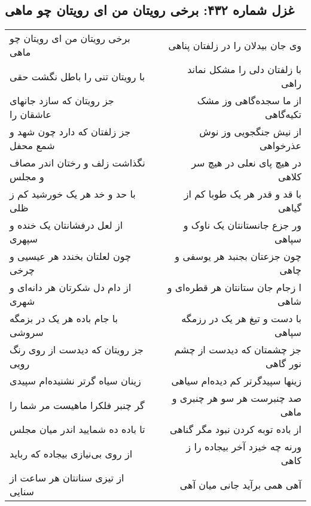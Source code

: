 \begin{center}
\section*{غزل شماره ۴۳۲: برخی رویتان من ای رویتان چو ماهی}
\label{sec:432}
\begin{longtable}{l p{0.5cm} r}
برخی رویتان من ای رویتان چو ماهی
&&
وی جان بیدلان را در زلفتان پناهی
\\
با رویتان تنی را باطل نگشت حقی
&&
با زلفتان دلی را مشکل نماند راهی
\\
جز رویتان که سازد جانهای عاشقان را
&&
از ما سجده‌گاهی وز مشک تکیه‌گاهی
\\
جز زلفتان که دارد چون شهد و شمع محفل
&&
از نیش جنگجویی وز نوش عذرخواهی
\\
نگذاشت زلف و رختان اندر مصاف و مجلس
&&
در هیچ پای نعلی در هیچ سر کلاهی
\\
با حد و خد هر یک خورشید کم ز ظلی
&&
با قد و قدر هر یک طوبا کم از گیاهی
\\
از لعل درفشانتان یک خنده و سپهری
&&
ور جزع جانستانتان یک ناوک و سپاهی
\\
چون لعلتان بخندد هر عیسیی و چرخی
&&
چون جزعتان بجنبد هر یوسفی و چاهی
\\
از دام دل شکرتان هر دانه‌ای و شهری
&&
ا زجام جان ستانتان هر قطره‌ای و شاهی
\\
با جام باده هر یک در بزمگه سروشی
&&
با دست و تیغ هر یک در رزمگه سپاهی
\\
جز رویتان که دیدست از روی رنگ رویی
&&
جز چشمتان که دیدست از چشم نور گاهی
\\
زینان سیاه گرتر نشنیده‌ام سپیدی
&&
زینها سپیدگرتر کم دیده‌ام سیاهی
\\
گر چنبر فلکرا ماهیست مر شما را
&&
صد چنبرست هر سو هر چنبری و ماهی
\\
تا باده ده شمایید اندر میان مجلس
&&
از باده توبه کردن نبود مگر گناهی
\\
از روی بی‌نیازی بیجاده که رباید
&&
ورنه چه خیزد آخر بیجاده را ز کاهی
\\
از تیزی سنانتان هر ساعت از سنایی
&&
آهی همی برآید جانی میان آهی
\\
\end{longtable}
\end{center}
